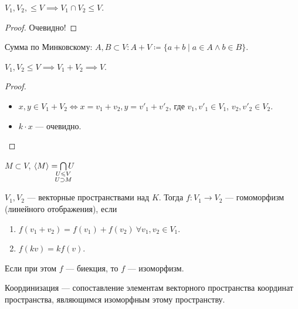 \begin{statement}
    $V_1, V_2, \le V \implies V_1 \cap V_2 \le V$.
\end{statement}
\begin{proof}
    Очевидно!
\end{proof}
\begin{definition}
   Сумма по Минковскому: $A, B \subset V\!: A + V \coloneqq \{a + b \mid a \in A \land b \in B\}$. 
\end{definition}
\begin{statement}
    $V_1, V_2 \le V \implies V_1 + V_2 \implies V$.
\end{statement}
\begin{proof}
    \slashn
    \begin{itemize}
        \item $x, y \in V_1 + V_2 \iff x = v_1 + v_2, y = v'_1 + v'_2$, где $v_1, v'_1 \in V_1$, $v_2, v'_2 \in V_2$.
        \item $k \cdot x$ --- очевидно.
    \end{itemize}
\end{proof}
\begin{remark}
    $M \subset V$,  $\langle M \rangle = \bigcap\limits_{\mathclap{\substack{U \le V \\ U \supset M}}} U$
\end{remark}
\begin{definition}
    $V_1, V_2$ --- векторные пространствами над $K$. Тогда  $f\!: V_1 \to V_2$ --- гомоморфизм (линейного отображения), если 
    \begin{enumerate}
        \item $f(v_1+v_2) = f(v_1) + f(v_2)\ \forall v_1, v_2 \in V_1$.
        \item $f(kv) = k f(v)$.
    \end{enumerate}

    Если при этом $f$ --- биекция, то  $f$ --- изоморфизм.
\end{definition}
\begin{remark}
    Координизация --- сопоставление элементам векторного пространства координат пространства, являющимся изоморфным этому пространству. 
\end{remark}
